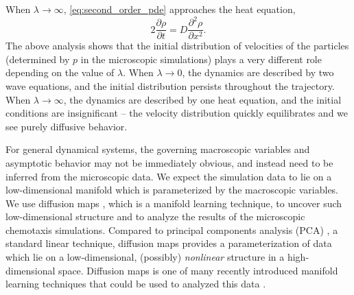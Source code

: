 \documentclass[prl, reprint]{revtex4-1}
\begin{document}
When $\lambda \rightarrow \infty$, \eqref{eq:second_order_pde} approaches the heat equation,
\begin{equation}
2 \frac{\partial \rho}{\partial t} = D \frac{\partial ^2 \rho}{\partial x^2}.
\end{equation}
%
%
The above analysis shows that the initial distribution of velocities of the particles (determined by $p$ in the microscopic simulations) plays a very different role depending on the value of $\lambda$.
%
When $\lambda \rightarrow 0$, the dynamics are described by two wave equations, and the initial distribution persists throughout the trajectory.
%
When $\lambda \rightarrow \infty$, the dynamics are described by one heat equation, and the initial conditions are insignificant -- the velocity distribution quickly equilibrates and we see purely diffusive behavior.

For general dynamical systems, the governing macroscopic variables and asymptotic behavior may not be immediately obvious, and instead need to be inferred from the microscopic data.
%
We expect the simulation data to lie on a low-dimensional manifold which is parameterized by the macroscopic variables.
%
We use diffusion maps \cite{coifman2005geometric}, which is a manifold learning technique, to uncover such low-dimensional structure and to analyze the results of the microscopic chemotaxis simulations.
%
Compared to principal components analysis (PCA) \cite{shlens2005tutorial}, a standard linear technique, diffusion maps provides a parameterization of data which lie on a low-dimensional, (possibly) {\em nonlinear} structure in a high-dimensional space.
%
Diffusion maps is one of many recently introduced manifold learning techniques that could be used to analyzed this data \cite{roweis2000nonlinear, tenenbaum2000global, Belkin2003}.
\end{document}
